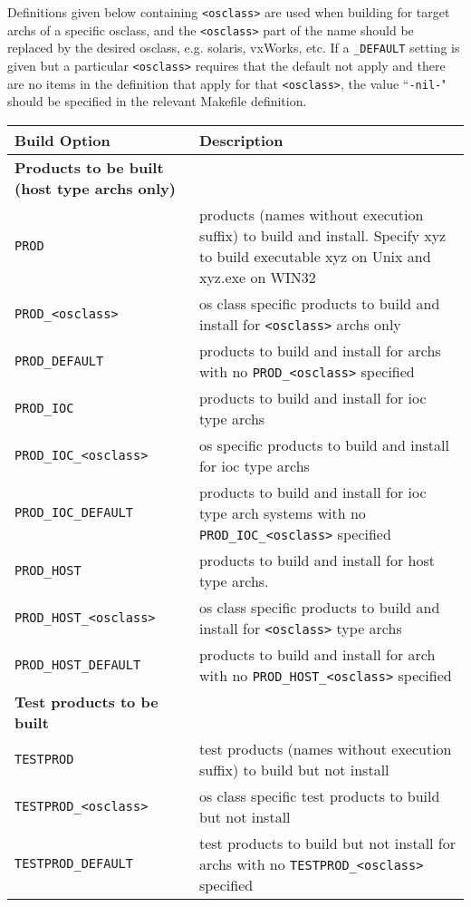 Definitions given below containing \verb|<osclass>| are used when building for target archs of a specific osclass, and the 
\verb|<osclass>| part of the name should be replaced by the desired osclass, e.g. solaris, vxWorks, etc. If a \verb|_DEFAULT| setting is 
given but a particular \verb|<osclass>| requires that the default not apply and there are no items in the definition that apply for 
that \verb|<osclass>|, the value ``\verb|-nil-|" should be specified in the relevant Makefile definition.
\begin{center}
\begin{longtable}
{p{2.94784in}p{3.76247in}}
\textbf{Build Option} & \textbf{Description}\\
\hline \hline
\textbf{Products to be built (host type archs only)} & \\
\hline
\verb|PROD| & products (names without execution suffix) to build and install. Specify xyz to build executable xyz on Unix and xyz.exe on WIN32\\
\verb|PROD_<osclass>| & os class specific products to build and install for \verb|<osclass>| archs only\\
\verb|PROD_DEFAULT| & products to build and install for archs with no \verb|PROD_<osclass>| specified\\
\verb|PROD_IOC| & products to build and install for ioc type archs\\
\verb|PROD_IOC_<osclass>| & os specific products to build and install for ioc type archs\\
\verb|PROD_IOC_DEFAULT| & products to build and install for ioc type arch systems with no \verb|PROD_IOC_<osclass>| specified\\
\verb|PROD_HOST| & products to build and install for host type archs. \\
\verb|PROD_HOST_<osclass>| & os class specific products to build and install for \verb|<osclass>| type archs\\
\verb|PROD_HOST_DEFAULT| & products to build and install for arch with no \verb|PROD_HOST_<osclass>| specified\\
\textbf{Test products to be built} & \\
\hline
\verb|TESTPROD| & test products (names without execution suffix) to build but not install \\
\verb|TESTPROD_<osclass>| & os class specific test products to build but not install\\
\verb|TESTPROD_DEFAULT| & test products to build but not install for archs with no \verb|TESTPROD_<osclass>| specified\\

\end{longtable}
\end{center}
